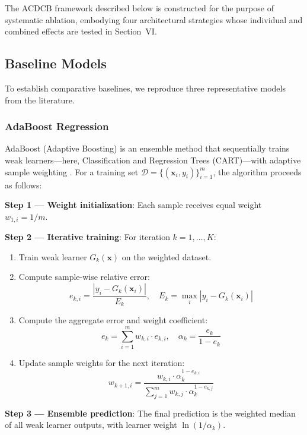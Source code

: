 \documentclass[journal]{IEEEtran}
\begin{document}
The ACDCB framework described below is constructed for the purpose of systematic ablation, embodying four architectural strategies whose individual and combined effects are tested in Section~VI.

\subsection{Baseline Models}

To establish comparative baselines, we reproduce three representative models from the literature.

\subsubsection{AdaBoost Regression}

AdaBoost (Adaptive Boosting) is an ensemble method that sequentially trains weak learners---here, Classification and Regression Trees (CART)---with adaptive sample weighting \cite{freund1997decision}. For a training set $\mathcal{D} = \{(\mathbf{x}_i, y_i)\}_{i=1}^{m}$, the algorithm proceeds as follows:

\textbf{Step 1 --- Weight initialization}: Each sample receives equal weight $w_{1,i} = 1/m$.

\textbf{Step 2 --- Iterative training}: For iteration $k = 1, \dots, K$:
\begin{enumerate}
\item Train weak learner $G_k(\mathbf{x})$ on the weighted dataset.
\item Compute sample-wise relative error:
\begin{equation}
e_{k,i} = \frac{|y_i - G_k(\mathbf{x}_i)|}{E_k}, \quad E_k = \max_i |y_i - G_k(\mathbf{x}_i)|
\end{equation}
\item Compute the aggregate error and weight coefficient:
\begin{equation}
e_k = \sum_{i=1}^{m} w_{k,i} \cdot e_{k,i}, \quad \alpha_k = \frac{e_k}{1 - e_k}
\end{equation}
\item Update sample weights for the next iteration:
\begin{equation}
w_{k+1,i} = \frac{w_{k,i} \cdot \alpha_k^{1 - e_{k,i}}}{\sum_{j=1}^{m} w_{k,j} \cdot \alpha_k^{1 - e_{k,j}}}
\end{equation}
\end{enumerate}

\textbf{Step 3 --- Ensemble prediction}: The final prediction is the weighted median of all weak learner outputs, with learner weight $\ln(1/\alpha_k)$.
\end{document}
